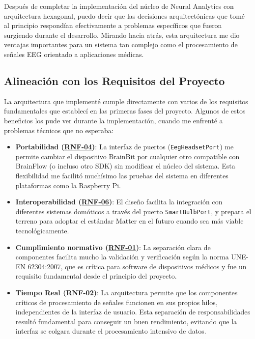Después de completar la implementación del núcleo de Neural Analytics con arquitectura hexagonal, puedo decir que las decisiones arquitectónicas que tomé al principio respondían efectivamente a problemas específicos que fueron surgiendo durante el desarrollo. Mirando hacia atrás, esta arquitectura me dio ventajas importantes para un sistema tan complejo como el procesamiento de señales EEG orientado a aplicaciones médicas.

\subsection{Alineación con los Requisitos del Proyecto}

La arquitectura que implementé cumple directamente con varios de los requisitos fundamentales que establecí en las primeras fases del proyecto. Algunos de estos beneficios los pude ver durante la implementación, cuando me enfrenté a problemas técnicos que no esperaba:

\begin{itemize}
    \item \textbf{Portabilidad (\hyperref[rnf-04]{RNF-04})}: La interfaz de puertos (\texttt{EegHeadsetPort}) me permite cambiar el dispositivo BrainBit por cualquier otro compatible con BrainFlow (o incluso otro SDK) sin modificar el núcleo del sistema. Esta flexibilidad me facilitó muchísimo las pruebas del sistema en diferentes plataformas como la Raspberry Pi.
    
    \item \textbf{Interoperabilidad (\hyperref[rnf-06]{RNF-06})}: El diseño facilita la integración con diferentes sistemas domóticos a través del puerto \texttt{SmartBulbPort}, y prepara el terreno para adoptar el estándar Matter en el futuro cuando sea más viable tecnológicamente.
    
    \item \textbf{Cumplimiento normativo (\hyperref[rnf-01]{RNF-01})}: La separación clara de componentes facilita mucho la validación y verificación según la norma UNE-EN 62304:2007, que es crítica para software de dispositivos médicos y fue un requisito fundamental desde el principio del proyecto.
    
    \item \textbf{Tiempo Real (\hyperref[rnf-02]{RNF-02})}: La arquitectura permite que los componentes críticos de procesamiento de señales funcionen en sus propios hilos, independientes de la interfaz de usuario. Esta separación de responsabilidades resultó fundamental para conseguir un buen rendimiento, evitando que la interfaz se colgara durante el procesamiento intensivo de datos.
\end{itemize}

